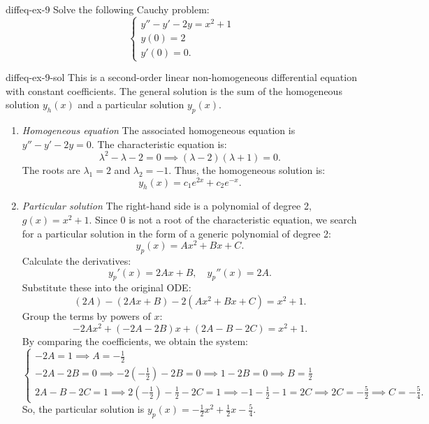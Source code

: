 \documentclass[preview]{standalone}
\begin{document}
\begin{snippetexercise}{diffeq-ex-9}{}
    Solve the following Cauchy problem:
    \[
        \begin{cases}
        y'' - y' - 2y = x^2 + 1 \\
        y(0) = 2 \\
        y'(0) = 0.
        \end{cases}
    \]
\end{snippetexercise}

\begin{snippetsolution}{diffeq-ex-9-sol}{}
    This is a second-order linear non-homogeneous differential equation with constant coefficients. The general solution is the sum of the homogeneous solution \( y_h(x) \) and a particular solution \( y_p(x) \).

    \begin{enumerate}
        \item \emph{Homogeneous equation}
        The associated homogeneous equation is \( y'' - y' - 2y = 0 \).
        The characteristic equation is:
        \[ \lambda^2 - \lambda - 2 = 0 \implies (\lambda - 2)(\lambda + 1) = 0. \]
        The roots are \( \lambda_1 = 2 \) and \( \lambda_2 = -1 \).
        Thus, the homogeneous solution is:
        \[ y_h(x) = c_1 e^{2x} + c_2 e^{-x}. \]

        \item \emph{Particular solution}
        The right-hand side is a polynomial of degree 2, \( g(x) = x^2 + 1 \). Since \( 0 \) is not a root of the characteristic equation, we search for a particular solution in the form of a generic polynomial of degree 2:
        \[ y_p(x) = Ax^2 + Bx + C. \]
        Calculate the derivatives:
        \[ y_p'(x) = 2Ax + B, \quad y_p''(x) = 2A. \]
        Substitute these into the original ODE:
        \[ (2A) - (2Ax + B) - 2(Ax^2 + Bx + C) = x^2 + 1. \]
        Group the terms by powers of \( x \):
        \[ -2Ax^2 + (-2A - 2B)x + (2A - B - 2C) = x^2 + 1. \]
        By comparing the coefficients, we obtain the system:
        \[
        \begin{cases}
            -2A = 1 \implies A = -\frac{1}{2} \\
            -2A - 2B = 0 \implies -2(-\frac{1}{2}) - 2B = 0 \implies 1 - 2B = 0 \implies B = \frac{1}{2} \\
            2A - B - 2C = 1 \implies 2(-\frac{1}{2}) - \frac{1}{2} - 2C = 1 \implies -1 - \frac{1}{2} - 1 = 2C \implies 2C = -\frac{5}{2} \implies C = -\frac{5}{4}.
        \end{cases}
        \]
        So, the particular solution is \( y_p(x) = -\frac{1}{2}x^2 + \frac{1}{2}x - \frac{5}{4} \).


\end{enumerate}
\end{snippetsolution}
\end{document}
